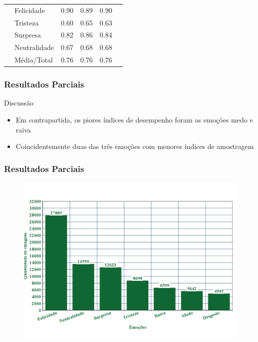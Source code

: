 \documentclass{beamer}
\begin{document}
\begin{frame}
\begin{table}[]
\begin{tabular}{llcccc}
                                    & Felicidade   & 0.90     & 0.89      & 0.90     &                                 \\
                                    & Tristeza     & 0.60     & 0.65      & 0.63     &                                 \\
                                    & Surpresa     & 0.82     & 0.86      & 0.84     &                                 \\
                                    & Neutralidade & 0.67     & 0.68      & 0.68     &                                 \\
                                    & Média/Total  & 0.76     & 0.76      & 0.76     &                                 \\ \hline
\end{tabular}
\end{table} 
\end{frame}


\begin{frame}
\frametitle{Resultados Parciais}
 \begin{block}{Discussão}
\begin{itemize}
\item Em contrapartida, os piores índices de desempenho foram as emoções medo e raiva
\pause
\item Coincidentemente duas das três emoções com menores índices de amostragem
\end{itemize}
\end{block}
\end{frame}


\begin{frame}
\frametitle{Resultados Parciais}
\begin{figure}
\centering
\includegraphics[scale=0.35]{figuras/grafico_emocoes.png}
\label{fig:arquitetura4}
\end{figure}
\end{frame}
\end{document}
